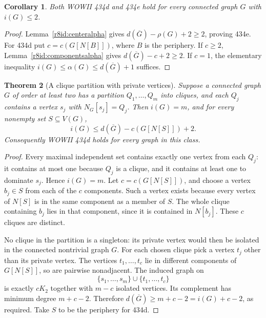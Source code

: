 \documentclass[11pt,a4paper]{article}
\newtheorem{theorem}{Theorem}[section]
\newtheorem{corollary}[theorem]{Corollary}
\theoremstyle{remark}
\begin{document}
\begin{corollary}\label{r8id:smalli}
Both WOWII 434d and 434e hold for every connected graph $G$ with
$i(G)\le2$.
\end{corollary}
\begin{proof}
Lemma~\ref{r8id:centeralpha} gives
$d(\overline G)-\rho(G)+2\ge2$, proving 434e.
For 434d put $c=c(G[N[B]])$, where $B$ is the periphery.
If $c\ge2$, Lemma~\ref{r8id:componentsalpha} gives
$d(\overline G)-c+2\ge2$.
If $c=1$, the elementary inequality
$i(G)\le\alpha(G)\le d(\overline G)+1$ suffices.
\end{proof}

\begin{theorem}[A clique partition with private vertices]
\label{r8id:cliquepartition}
Suppose a connected graph $G$ of order at least two has a partition
$Q_1,\ldots,Q_m$ into cliques, and each $Q_j$ contains a vertex $s_j$
with $N_G[s_j]=Q_j$. Then $i(G)=m$, and for every nonempty set
$S\subseteq V(G)$,
\[
 i(G)\le d(\overline G)-c(G[N[S]])+2.
\]
Consequently WOWII 434d holds for every graph in this class.
\end{theorem}
\begin{proof}
Every maximal independent set contains exactly one vertex from each
$Q_j$: it contains at most one because $Q_j$ is a clique, and it
contains at least one to dominate $s_j$. Hence $i(G)=m$.
Let $c=c(G[N[S]])$, and choose a vertex $b_j\in S$ from each of the
$c$ components. Such a vertex exists because every vertex of $N[S]$
is in the same component as a member of $S$.
The whole clique containing $b_j$ lies in that component, since it
is contained in $N[b_j]$. These $c$ cliques are distinct.

No clique in the partition is a singleton: its private vertex would
then be isolated in the connected nontrivial graph $G$.
For each chosen clique pick a vertex $t_j$ other than its private
vertex. The vertices $t_1,\ldots,t_c$ lie in different components
of $G[N[S]]$, so are pairwise nonadjacent. The induced graph on
\[
 \{s_1,\ldots,s_m\}\cup\{t_1,\ldots,t_c\}
\]
is exactly $cK_2$ together with $m-c$ isolated vertices. Its complement
has minimum degree $m+c-2$. Therefore
$d(\overline G)\ge m+c-2=i(G)+c-2$, as required.
Take $S$ to be the periphery for 434d.
\end{proof}
\end{document}
